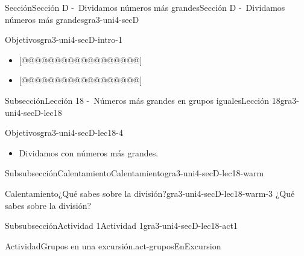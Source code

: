 \documentclass[twoside,10pt,]{article}
\begin{document}
%
%
\typeout{************************************************}
\typeout{************************************************}
%
\begin{sectionptx}{Sección}{Sección D -~Dividamos números más grandes}{}{Sección D -~Dividamos números más grandes}{}{}{gra3-uni4-secD}
\begin{introduction}{}%
\begin{objectives}{Objetivos}{gra3-uni4-secD-intro-1}
%
\begin{itemize}[label=\textbullet]
\item{}[@@@@@@@@@@@@@@@@@@]%
\item{}[@@@@@@@@@@@@@@@@@@]%
\end{itemize}
\end{objectives}
\end{introduction}%
%
%
\typeout{************************************************}
\typeout{************************************************}
%
\begin{subsectionptx}{Subsección}{Lección 18 -~Números más grandes en grupos iguales}{}{Lección 18}{}{}{gra3-uni4-secD-lec18}
\begin{objectives}{Objetivos}{gra3-uni4-secD-lec18-4}
%
\begin{itemize}[label=\textbullet]
\item{}Dividamos con números más grandes.%
\end{itemize}
\end{objectives}
%
%
\typeout{************************************************}
\typeout{************************************************}
%
\begin{subsubsectionptx}{Subsubsección}{Calentamiento}{}{Calentamiento}{}{}{gra3-uni4-secD-lec18-warm}
\begin{exploration}{Calentamiento}{¿Qué sabes sobre la división?}{gra3-uni4-secD-lec18-warm-3}%
¿Qué sabes sobre la división?%
\end{exploration}%
\end{subsubsectionptx}
%
%
\typeout{************************************************}
\typeout{************************************************}
%
\begin{subsubsectionptx}{Subsubsección}{Actividad 1}{}{Actividad 1}{}{}{gra3-uni4-secD-lec18-act1}
\begin{activity}{Actividad}{Grupos en una excursión.}{act-gruposEnExcursion}%

\end{activity}
\end{subsubsectionptx}
\end{subsectionptx}
\end{sectionptx}
\end{document}
